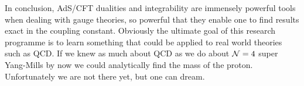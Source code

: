 In conclusion, AdS/CFT dualities and integrability are immensely powerful tools when dealing with gauge theories, so powerful that they enable one to find results exact in the coupling constant.
Obviously the ultimate goal of this research programme is to learn something that could be applied to real world theories such as QCD.
If we knew as much about QCD as we do about $\mathcal{N}=4$ super Yang-Mills by now we could analytically find the mass of the proton.
Unfortunately we are not there yet, but one can dream.




